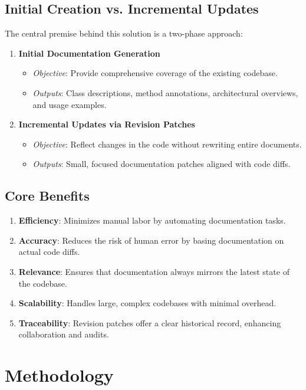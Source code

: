 \documentclass[12pt,oneside]{article}
\begin{document}
\subsection{Initial Creation vs. Incremental Updates}
The central premise behind this solution is a two-phase approach:

\begin{enumerate}
  \item \textbf{Initial Documentation Generation}
  \begin{itemize}
    \item \emph{Objective}: Provide comprehensive coverage of the existing codebase.
    \item \emph{Outputs}: Class descriptions, method annotations, architectural overviews, and usage examples.
  \end{itemize}

  \item \textbf{Incremental Updates via Revision Patches}
  \begin{itemize}
    \item \emph{Objective}: Reflect changes in the code without rewriting entire documents.
    \item \emph{Outputs}: Small, focused documentation patches aligned with code diffs.
  \end{itemize}
\end{enumerate}

\subsection{Core Benefits}
\begin{enumerate}
  \item \textbf{Efficiency}: Minimizes manual labor by automating documentation tasks.
  \item \textbf{Accuracy}: Reduces the risk of human error by basing documentation on actual code diffs.
  \item \textbf{Relevance}: Ensures that documentation always mirrors the latest state of the codebase.
  \item \textbf{Scalability}: Handles large, complex codebases with minimal overhead.
  \item \textbf{Traceability}: Revision patches offer a clear historical record, enhancing collaboration and audits.
\end{enumerate}

\section{Methodology}
\end{document}
